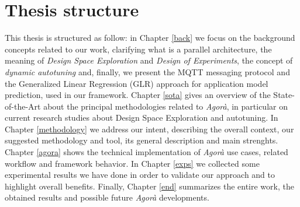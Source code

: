 \section{Thesis structure}

This thesis is structured as follow: in Chapter \ref{back} we focus on the background concepts related to our work, clarifying what is a parallel architecture, the meaning of \textit{Design Space Exploration} and \textit{Design of Experiments}, the concept of \textit{dynamic autotuning} and, finally, we present the MQTT messaging protocol and the Generalized Linear Regression (GLR) approach for application model prediction, used in our framework. Chapter \ref{sota} gives an overview of the State-of-the-Art about the principal methodologies related to \textit{Agorà}, in particular on current research studies about Design Space Exploration and autotuning. In Chapter \ref{methodology} we address our intent, describing the overall context, our suggested methodology and tool, its general description and main strenghts. Chapter \ref{agora} shows the technical implementation of \textit{Agorà} use cases, related workflow and framework behavior. In Chapter \ref{exps} we collected some experimental results we have done in order to validate our approach and to highlight overall benefits. Finally, Chapter \ref{end} summarizes the entire work, the obtained results and possible future \textit{Agorà} developments.
